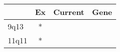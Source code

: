 \begin{tabular}{lccr}
\toprule
{} & Ex & Current & Gene \\
\midrule
9q13  &  * &         &      \\
11q11 &  * &         &      \\
\bottomrule
\end{tabular}
